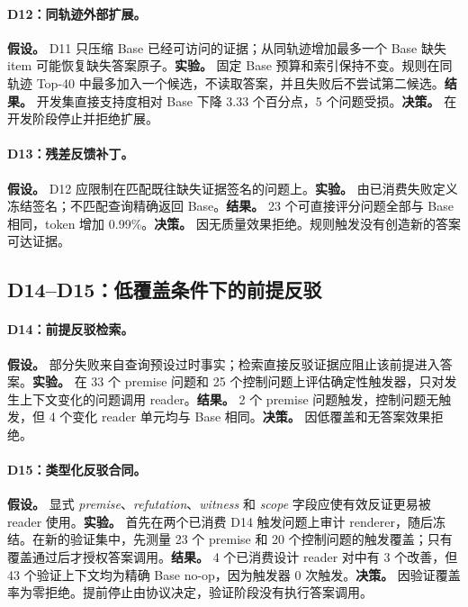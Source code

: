 \paragraph{D12：同轨迹外部扩展。}
\textbf{假设。} D11 只压缩 Base 已经可访问的证据；从同轨迹增加最多一个 Base 缺失 item 可能恢复缺失答案原子。\textbf{实验。} 固定 Base 预算和索引保持不变。规则在同轨迹 Top-40 中最多加入一个候选，不读取答案，并且失败后不尝试第二候选。\textbf{结果。} 开发集直接支持度相对 Base 下降 3.33 个百分点，5 个问题受损。\textbf{决策。} 在开发阶段停止并拒绝扩展。

\paragraph{D13：残差反馈补丁。}
\textbf{假设。} D12 应限制在匹配既往缺失证据签名的问题上。\textbf{实验。} 由已消费失败定义冻结签名；不匹配查询精确返回 Base。\textbf{结果。} 23 个可直接评分问题全部与 Base 相同，token 增加 0.99\%。\textbf{决策。} 因无质量效果拒绝。规则触发没有创造新的答案可达证据。

\subsection{D14--D15：低覆盖条件下的前提反驳}

\paragraph{D14：前提反驳检索。}
\textbf{假设。} 部分失败来自查询预设过时事实；检索直接反驳证据应阻止该前提进入答案。\textbf{实验。} 在 33 个 premise 问题和 25 个控制问题上评估确定性触发器，只对发生上下文变化的问题调用 reader。\textbf{结果。} 2 个 premise 问题触发，控制问题无触发，但 4 个变化 reader 单元均与 Base 相同。\textbf{决策。} 因低覆盖和无答案效果拒绝。

\paragraph{D15：类型化反驳合同。}
\textbf{假设。} 显式 \emph{premise}、\emph{refutation}、\emph{witness} 和 \emph{scope} 字段应使有效反证更易被 reader 使用。\textbf{实验。} 首先在两个已消费 D14 触发问题上审计 renderer，随后冻结。在新的验证集中，先测量 23 个 premise 和 20 个控制问题的触发覆盖；只有覆盖通过后才授权答案调用。\textbf{结果。} 4 个已消费设计 reader 对中有 3 个改善，但 43 个验证上下文均为精确 Base no-op，因为触发器 0 次触发。\textbf{决策。} 因验证覆盖率为零拒绝。提前停止由协议决定，验证阶段没有执行答案调用。

